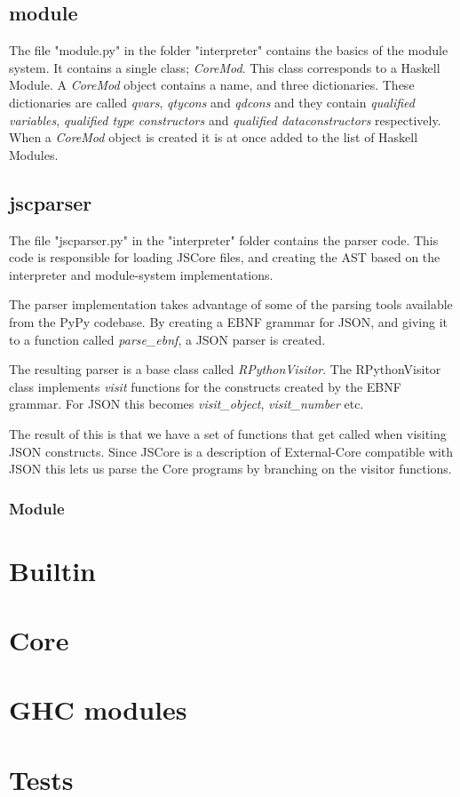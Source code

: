 \subsection{module}

The file "module.py" in the folder "interpreter" contains the basics of the
module system. It contains a single class; \emph{CoreMod}. This class corresponds
to a Haskell Module. A \emph{CoreMod} object contains a name, and three dictionaries.
These dictionaries are called \emph{qvars}, \emph{qtycons} and \emph{qdcons} and they
contain \emph{qualified variables}, \emph{qualified type constructors} and 
\emph{qualified dataconstructors} respectively. When a \emph{CoreMod} object is created
it is at once added to the list of Haskell Modules.

\subsection{jscparser}

The file "jscparser.py" in the "interpreter" folder contains the parser code. 
This code is responsible for loading JSCore files, and creating the AST based 
on the interpreter and module-system implementations.

The parser implementation takes advantage of some of the parsing tools 
available from
the PyPy codebase. By creating a EBNF grammar for JSON, and giving it to a 
function called \emph{parse\_ebnf}, a JSON parser is created.

The resulting parser is a base class called \emph{RPythonVisitor}. The 
RPythonVisitor
class implements \emph{visit} functions for the constructs created by the 
EBNF grammar. For JSON this becomes \emph{visit\_object}, 
\emph{visit\_number} etc.

The result of this is that we have a set of functions that get called when 
visiting JSON constructs. Since JSCore is a description of External-Core 
compatible with JSON this lets us parse the Core programs by branching 
on the visitor functions.

\subsubsection{Module}


\section{Builtin}

\section{Core}

\section{GHC modules}

\section{Tests}

